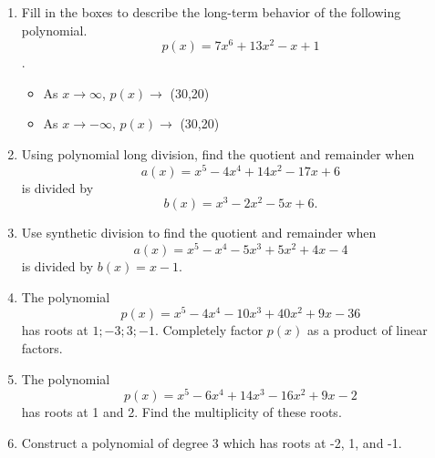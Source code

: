 \documentclass{article}
\begin{document}
\ActivityTitle[class={College Algebra}, number={3}, name={Polynomials 1}]

\begin{enumerate}
\item Fill in the boxes to describe the long-term behavior of the following polynomial. \[ p(x) = 7x^6 + 13x^2 - x + 1 \].

\begin{itemize}
\item As $x \rightarrow \infty$, $p(x) \rightarrow$ \framebox(30,20){} \vspace{0.5cm}
\item As $x \rightarrow -\infty$, $p(x) \rightarrow$ \framebox(30,20){}
\end{itemize} \vspace{1cm}

\item Using polynomial long division, find the quotient and remainder when \[ a(x) = x^5 - 4x^4 + 14x^2 - 17x + 6 \] is divided by \[ b(x) = x^3 - 2x^2 - 5x + 6. \] \vspace{6cm}

\item Use synthetic division to find the quotient and remainder when \[ a(x) = x^5 - x^4 - 5x^3 + 5x^2 + 4x - 4 \] is divided by $b(x) = x - 1$. \vspace{3cm}

\newpage

\item The polynomial \[ p(x) = x^5 - 4x^4 - 10x^3 + 40x^2 + 9x - 36 \] has roots at ${1;-3;3;-1}$. Completely factor $p(x)$ as a product of linear factors. \vspace{7cm}

\item The polynomial \[ p(x) = x^5 - 6x^4 + 14x^3 - 16x^2 + 9x - 2 \] has roots at 1 and 2. Find the multiplicity of these roots. \vspace{7cm}

\item Construct a polynomial of degree 3 which has roots at -2, 1, and -1. \vspace{7cm}
\end{enumerate}
\end{document}
